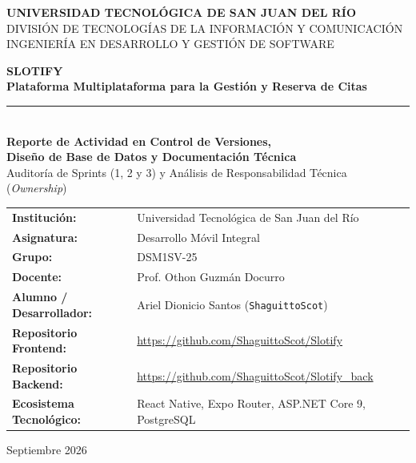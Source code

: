 \documentclass[11pt,letterpaper]{article}
\begin{document}
\begin{titlepage}
    \centering
    \vspace*{0.5cm}
    
    {\Large \textbf{UNIVERSIDAD TECNOLÓGICA DE SAN JUAN DEL RÍO}}\\[0.25cm]
    {\normalsize DIVISIÓN DE TECNOLOGÍAS DE LA INFORMACIÓN Y COMUNICACIÓN}\\[0.15cm]
    {\normalsize INGENIERÍA EN DESARROLLO Y GESTIÓN DE SOFTWARE}
    
    \vspace{2.2cm}
    
    {\Huge \textbf{SLOTIFY}}\\[0.4cm]
    {\large \textbf{Plataforma Multiplataforma para la Gestión y Reserva de Citas}}\\[0.8cm]
    
    \rule{0.75\textwidth}{1pt}\\[0.8cm]
    
    {\Large \textbf{Reporte de Actividad en Control de Versiones,\\Diseño de Base de Datos y Documentación Técnica}}\\[0.35cm]
    {\normalsize Auditoría de Sprints (1, 2 y 3) y Análisis de Responsabilidad Técnica (\textit{Ownership})}
    
    \vspace{2.2cm}
    
    \renewcommand{\arraystretch}{1.6}
    \begin{tabular}{L{4.4cm} L{11.5cm}}
        \textbf{Institución:} & Universidad Tecnológica de San Juan del Río \\[0.05cm]
        \textbf{Asignatura:} & Desarrollo Móvil Integral \\[0.05cm]
        \textbf{Grupo:} & DSM1SV-25 \\[0.05cm]
        \textbf{Docente:} & Prof. Othon Guzmán Docurro \\[0.05cm]
        \textbf{Alumno / Desarrollador:} & Ariel Dionicio Santos (\texttt{ShaguittoScot}) \\[0.05cm]
        \textbf{Repositorio Frontend:} & \url{https://github.com/ShaguittoScot/Slotify} \\[0.05cm]
        \textbf{Repositorio Backend:} & \url{https://github.com/ShaguittoScot/Slotify_back} \\[0.05cm]
        \textbf{Ecosistema Tecnológico:} & React Native, Expo Router, ASP.NET Core 9, PostgreSQL \\
    \end{tabular}
    \renewcommand{\arraystretch}{1.0}
    
    \vfill
    
    {\normalsize Septiembre 2026}
    \vspace*{0.4cm}
\end{titlepage}
\end{document}
